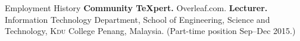 \begin{rubric}{Employment History}
%
	\textbf{Community \TeX{}pert.} Overleaf.com.
%
%
\entry*[2013 -- 2015]%
	\textbf{Lecturer.} Information Technology Department, School of Engineering, Science and Technology, \textsc{Kdu} College Penang, Malaysia. (Part-time position Sep--Dec 2015.)
%
\end{rubric}
